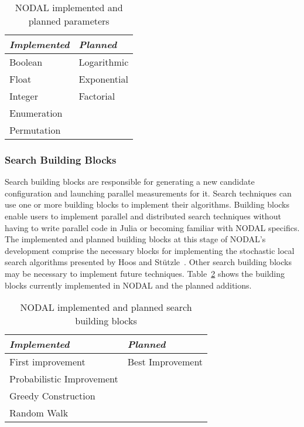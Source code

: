 \begin{table}[htpb]
\centering
\begin{tabular}{@{}p{}p{}@{}}
\toprule
\textit{Implemented} & \textit{Planned} \\ \midrule
Boolean & Logarithmic \\
Float & Exponential \\
Integer & Factorial \\
Enumeration & \\
Permutation & \\ \bottomrule
\end{tabular}
\caption{NODAL implemented and planned parameters}
\label{tab:nodal-parameters}
\end{table}

\subsubsection{Search Building Blocks}

Search building blocks are responsible for generating a new candidate
configuration and launching parallel measurements for it. Search techniques can
use one or more building blocks to implement their algorithms. Building blocks
enable users to implement parallel and distributed search techniques without
having to write parallel code in Julia or becoming familiar with NODAL
specifics. The implemented and planned building blocks at this stage of NODAL's
development comprise the necessary blocks for implementing the stochastic local
search algorithms presented by Hoos and Stützle~\cite{hoos2015stochastic}.
Other search building blocks may be necessary to implement future techniques.
Table~\ref{tab:nodal-blocks} shows the building blocks currently implemented in
NODAL and the planned additions.

\begin{table}[htpb]
\centering
\begin{tabular}{@{}p{}p{}@{}}
\toprule
\textit{Implemented} & \textit{Planned} \\ \midrule
First improvement & Best Improvement \\
Probabilistic Improvement & \\
Greedy Construction & \\
Random Walk & \\ \bottomrule
\end{tabular}
\caption{NODAL implemented and planned search building blocks}
\label{tab:nodal-blocks}
\end{table}


